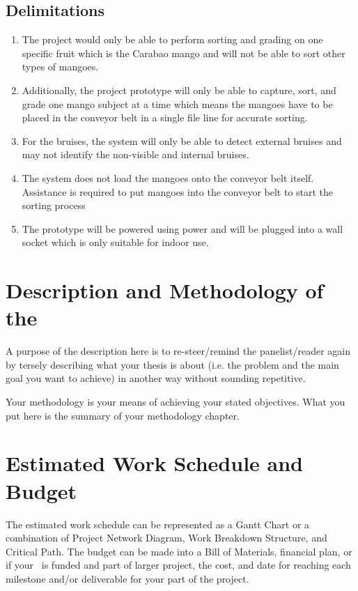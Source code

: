\subsection{Delimitations}
\begin{enumerate}
	\item The project would only be able to perform sorting and grading on one specific fruit 
	which is the Carabao mango and will not be able to sort other types of mangoes.
	
	\item Additionally, the project prototype will only be able to capture, sort, and grade one 
	mango subject at a time which means the mangoes have to be placed in the conveyor belt in
	 a single file line for accurate sorting. 
	
	\item For the bruises, the system will only be able to detect external bruises and 
	may not identify the non-visible and internal bruises.
	\item The system does not load the mangoes onto the conveyor belt itself. 
	Assistance is required to put mangoes into the conveyor belt to start the sorting process
	\item The prototype will be powered using  power and will be plugged into 
	a wall socket which is only suitable for indoor use.
\end{enumerate}

\section{Description and Methodology of the \documentType}

A purpose of the description here is to re-steer/remind the panelist/reader again by tersely describing what your thesis is about (i.e. the problem and the main goal you want to achieve) in another way without sounding repetitive. 

Your methodology is your means of achieving your stated objectives. What you put here is the summary of your methodology chapter.



\graytx{\blindtext}


\ifFinished
\else

\section{Estimated Work Schedule and Budget}

The estimated work schedule can be represented as a Gantt Chart or a combination of Project Network Diagram, Work Breakdown Structure, and Critical Path.  The budget can be made into a Bill of Materials, financial plan, or if your \documentType \ is funded and part of larger project, the cost, and date for reaching each milestone and/or deliverable for your part of the project.

